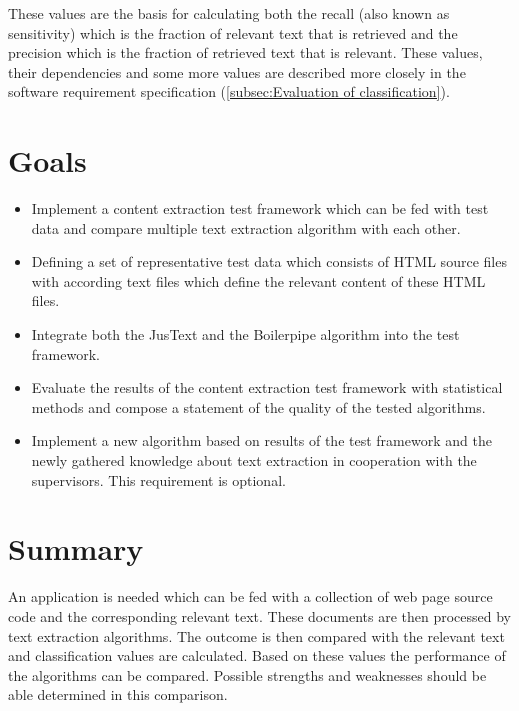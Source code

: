 These values are the basis for calculating  both the recall (also known as sensitivity) which is the fraction of relevant text that is retrieved and the precision which is the fraction of retrieved text that is relevant. These values, their dependencies and some more values are described more closely in the software requirement specification (\ref{subsec:Evaluation of classification}).

\section{Goals}

\begin{itemize}
\item Implement a content extraction test framework which can be fed with test data and compare multiple text extraction algorithm with each other.
\item Defining a set of representative test data which consists of HTML source files with according text files which define the relevant content of these HTML files.
\item Integrate both the JusText and the Boilerpipe algorithm into the test framework.
\item Evaluate the results of the content extraction test framework with statistical methods and compose a statement of the quality of the tested algorithms.
\item Implement a new algorithm based on results of the test framework and the newly gathered knowledge about text extraction in cooperation with the supervisors. This requirement is optional.
\end{itemize}



\section{Summary}

An application is needed which can be fed with a  collection of web page source code and the corresponding relevant text. These documents are then processed by text extraction algorithms. The outcome is then compared with the relevant text and classification values are calculated. Based on these values the performance of the algorithms can be compared. Possible strengths and weaknesses should be able determined in this comparison.

